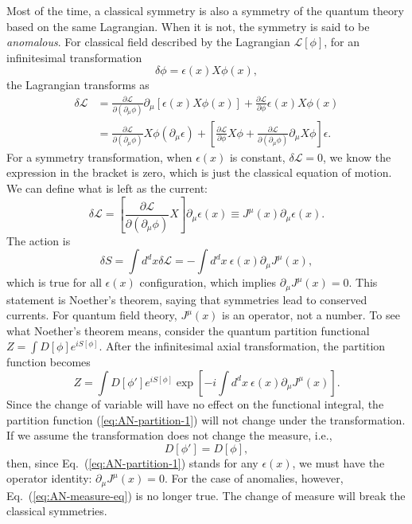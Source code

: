\documentclass[aps,prb,superscriptaddress,nofootinbib]{revtex4}
\begin{document}
Most of the time, a classical symmetry is also a symmetry of the quantum theory based on the same Lagrangian.
When it is not, the symmetry is said to be \textit{anomalous}.
For classical field described by the Lagrangian $\mathcal L[\phi]$, for an infinitesimal transformation 
\begin{equation}
	\delta\phi = \epsilon(x) X \phi(x),
\end{equation}
the Lagrangian transforms as
\begin{equation}
\begin{aligned}
	\delta \mathcal L 
	&= \frac{\partial \mathcal L}{\partial(\partial_\mu \phi)} \partial_\mu[\epsilon(x) X \phi(x)] + \frac{\partial \mathcal L}{\partial \phi} \epsilon(x) X \phi(x) \\
	&= \frac{\partial \mathcal L}{\partial(\partial_\mu \phi)}X \phi (\partial_\mu\epsilon) + \left[\frac{\partial \mathcal L}{\partial \phi}X\phi + \frac{\partial \mathcal L}{\partial(\partial_\mu \phi)}\partial_\mu X \phi \right]\epsilon.
\end{aligned}
\end{equation}
For a symmetry transformation, when $\epsilon(x)$ is constant, $\delta \mathcal L = 0$, we know the expression in the bracket is zero, which is just the classical equation of motion.
We can define what is left as the current:
\begin{equation}
	\delta \mathcal L = \left[\frac{\partial \mathcal L}{\partial(\partial_\mu \phi)}X \right] \partial_\mu\epsilon(x)
	\equiv J^\mu(x) \partial_\mu \epsilon(x).
\end{equation}
The action is
\begin{equation}
	\delta S = \int d^d x \delta \mathcal L 
	= -\int d^d x\ \epsilon(x) \partial_\mu J^\mu(x),
\end{equation}
which is true for all $\epsilon(x)$ configuration, which implies $\partial_\mu J^\mu(x) = 0$.
This statement is Noether's theorem, saying that symmetries lead to conserved currents.
For quantum field theory, $J^\mu(x)$ is an operator, not a number.
To see what Noether's theorem means, consider the quantum partition functional $Z = \int D[\phi] e^{iS[\phi]}$.
After the infinitesimal axial transformation, the partition function becomes
\begin{equation}\label{eq:AN-partition-1}
	Z = \int D[\phi'] e^{iS[\phi]} \exp\left[-i\int d^d x \ \epsilon(x) \partial_\mu J^\mu (x)\right].
\end{equation}
Since the change of variable will have no effect on the functional integral, the partition function (\ref{eq:AN-partition-1}) will not change under the transformation.
If we assume the transformation does not change the measure, i.e.,
\begin{equation}\label{eq:AN-measure-eq}
	D[\phi'] = D[\phi],
\end{equation}
then, since Eq.~(\ref{eq:AN-partition-1}) stands for any $\epsilon(x)$, we must have the operator identity: $\partial_\mu J^\mu(x) = 0$.
For the case of anomalies, however, Eq.~(\ref{eq:AN-measure-eq}) is no longer true.
The change of measure will break the classical symmetries.
\end{document}
